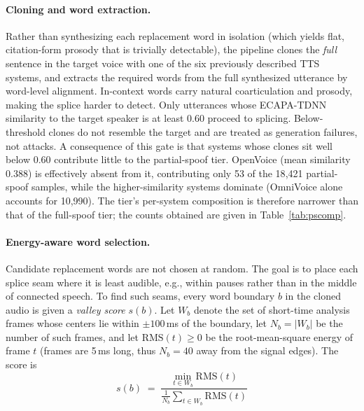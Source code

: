 \documentclass[11pt]{article}
\begin{document}
\paragraph{Cloning and word extraction.} Rather than synthesizing each
replacement word in isolation (which yields flat, citation-form prosody
that is trivially detectable), the pipeline clones the \emph{full}
sentence in the target voice with one of the six previously described
TTS systems, and extracts the required words from the full synthesized
utterance by word-level alignment.
In-context words carry natural coarticulation and prosody, making the
splice harder to detect. Only utterances whose ECAPA-TDNN similarity to the
target speaker is at least 0.60 proceed to splicing. Below-threshold
clones do not resemble the target and are treated as generation
failures, not attacks. A consequence of this gate is that systems whose
clones sit well below 0.60 contribute little to the partial-spoof tier.
OpenVoice (mean similarity 0.388) is effectively absent from it,
contributing only 53 of the 18{,}421 partial-spoof samples, while the
higher-similarity systems dominate (OmniVoice alone accounts for
10{,}990). The tier's per-system composition is therefore narrower than
that of the full-spoof tier; the counts obtained are given in
Table~\ref{tab:pscomp}.

\paragraph{Energy-aware word selection.} Candidate replacement words are
not chosen at random. The goal is to place each splice seam where it is
least audible, e.g., within pauses rather than in the middle of connected speech.
To find such seams, every word boundary $b$ in the cloned audio is given
a \emph{valley score} $s(b)$. Let $W_b$ denote the set of short-time
analysis frames whose centers lie within $\pm 100$\,ms of the boundary,
let $N_b = |W_b|$ be the number of such frames, and let
$\mathrm{RMS}(t) \ge 0$ be the root-mean-square energy of frame $t$
(frames are 5\,ms long, thus $N_b = 40$ away from the signal edges). The
score is
\begin{equation}
s(b) \;=\; \frac{\displaystyle\min_{t \in W_b} \mathrm{RMS}(t)}
                 {\displaystyle\frac{1}{N_b}\sum_{t \in W_b} \mathrm{RMS}(t)}
\label{eq:valleyscore}
\end{equation}
\end{document}
